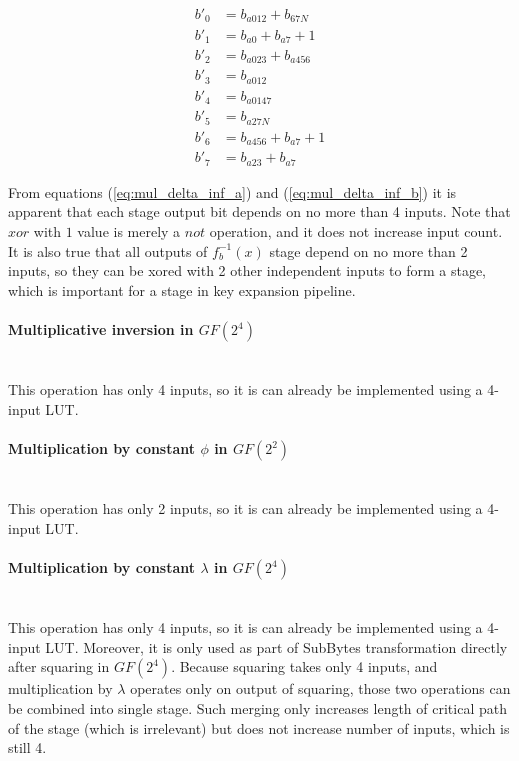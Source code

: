 \begin{equation}
\label{eq:mul_delta_inf_b}
\begin{aligned}
b'_0 &= b_{a012} + b_{67N}           \\
b'_1 &= b_{a0} + b_{a7} + 1          \\
b'_2 &= b_{a023} + b_{a456}          \\
b'_3 &= b_{a012}                     \\
b'_4 &= b_{a0147}                    \\
b'_5 &= b_{a27N}                     \\
b'_6 &= b_{a456} + b_{a7} + 1        \\
b'_7 &= b_{a23} + b_{a7}                    
\end{aligned}
\end{equation}

From equations (\ref{eq:mul_delta_inf_a}) and (\ref{eq:mul_delta_inf_b}) it is apparent that each stage output bit depends on no more than 4 inputs. Note that $xor$ with $1$ value is merely a $not$ operation, and it does not increase input count. It is also true that all outputs of $f_b^{-1}(x)$ stage depend on no more than 2 inputs, so they can be xored with 2 other independent inputs to form a stage, which is important for a stage in key expansion pipeline.




\paragraph{Multiplicative inversion in $GF(2^4)$}\mbox{}\\
This operation has only 4 inputs, so it is can already be implemented using a 4-input LUT.

\paragraph{Multiplication by constant $\phi$ in $GF(2^2)$}\mbox{}\\
This operation has only 2 inputs, so it is can already be implemented using a 4-input LUT. 

\paragraph{Multiplication by constant $\lambda$ in $GF(2^4)$}\mbox{}\\
This operation has only 4 inputs, so it is can already be implemented using a 4-input LUT. Moreover, it is only used as part of SubBytes transformation directly after squaring in $GF(2^4)$. Because squaring takes only 4 inputs, and multiplication by $\lambda$ operates only on output of squaring, those two operations can be combined into single stage. Such merging only increases length of critical path of the stage (which is irrelevant) but does not increase number of inputs, which is still 4.


